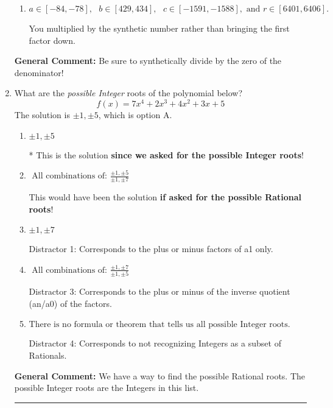 \documentclass{extbook}[14pt]
\newcommand{\litem}[1]{\item #1

\rule{\textwidth}{0.4pt}}
\begin{document}
\begin{enumerate}
{\begin{enumerate}[label=\Alph*.]
 You multiplied by the synthetic number and subtracted rather than adding during synthetic division.
\item \( a \in [-84, -78], \text{   } b \in [429, 434], \text{   } c \in [-1591, -1588], \text{   and   } r \in [6401, 6406]. \)

 You multiplied by the synthetic number rather than bringing the first factor down.
\end{enumerate}

\textbf{General Comment:} Be sure to synthetically divide by the zero of the denominator!
}
\litem{
What are the \textit{possible Integer} roots of the polynomial below?
\[ f(x) = 7x^{4} +2 x^{3} +4 x^{2} +3 x + 5 \]The solution is \( \pm 1,\pm 5 \), which is option A.\begin{enumerate}[label=\Alph*.]
\item \( \pm 1,\pm 5 \)

* This is the solution \textbf{since we asked for the possible Integer roots}!
\item \( \text{ All combinations of: }\frac{\pm 1,\pm 5}{\pm 1,\pm 7} \)

This would have been the solution \textbf{if asked for the possible Rational roots}!
\item \( \pm 1,\pm 7 \)

 Distractor 1: Corresponds to the plus or minus factors of a1 only.
\item \( \text{ All combinations of: }\frac{\pm 1,\pm 7}{\pm 1,\pm 5} \)

 Distractor 3: Corresponds to the plus or minus of the inverse quotient (an/a0) of the factors. 
\item \( \text{There is no formula or theorem that tells us all possible Integer roots.} \)

 Distractor 4: Corresponds to not recognizing Integers as a subset of Rationals.
\end{enumerate}

\textbf{General Comment:} We have a way to find the possible Rational roots. The possible Integer roots are the Integers in this list.
}
\end{enumerate}
\end{document}
